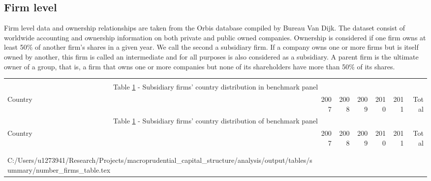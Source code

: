 \documentclass[12pt]{article}
\makeatletter
\newcommand\primitiveinput[1]
{\@@input #1 }
\makeatother
\begin{document}
	  	
 	\subsection{Firm level} \label{subsec:firm}
	Firm level data and ownership relationships are taken from the Orbis database compiled by Bureau Van Dijk. The dataset consist of worldwide accounting and ownership information on both private and public owned companies. Ownership is considered if one firm owns at least 50\% of another firm's shares in a given year. We call the second a subsidiary firm. If a company owns one or more firms but is itself owned by another, this firm is called an intermediate and for all purposes is also considered as a subsidiary. A parent firm is the ultimate owner of a group, that is, a firm that owns one or more companies but none of its shareholders have more than 50\% of its shares.
	
	\begin{small}
		{
			\begin{longtable}{lrrrrrr}\\
				\label{tab:number of firms}\\
				\multicolumn{7}{c}{Table \ref{tab:number of firms} - Subsidiary firms' country distribution in benchmark panel}\\
				\hline \hline \addlinespace Country & 2007 & 2008 & 2009 & 2010 & 2011 & Total  \\
				\endfirsthead
				\multicolumn{7}{c}{Table \ref{tab:number of firms} - Subsidiary firms' country distribution of benchmark panel}\\
				\hline \hline \addlinespace Country & 2007 & 2008 & 2009 & 2010 & 2011 & Total  \\
				\hline \addlinespace \endhead
				\hline
				\multicolumn{7}{r}{{\textit{(Continued)}}}\\ \endfoot
				\\ 	
				\endlastfoot
				\primitiveinput{C:/Users/u1273941/Research/Projects/macroprudential_capital_structure/analysis/output/tables/summary/number_firms_table.tex}
				\hline 			
			\end{longtable}	
		}
	\end{small}
	
\end{document}
